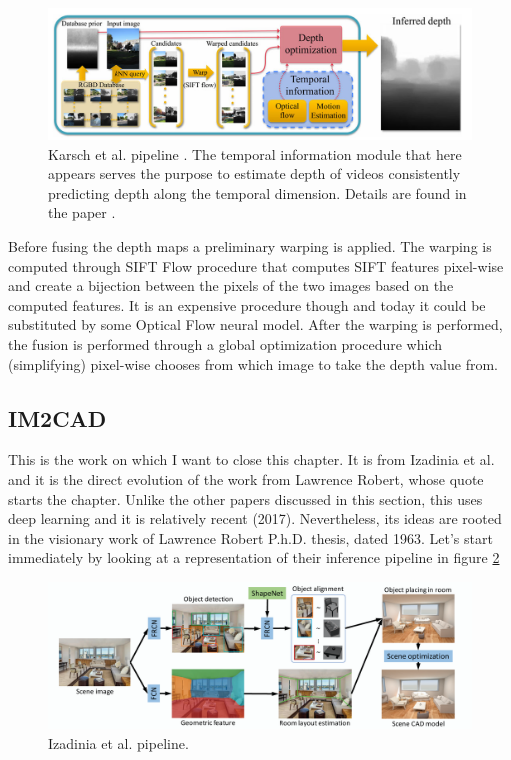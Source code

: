 \begin{figure}
	\centering
	\includegraphics[scale=0.3]{figs/depthtransfer}
	\caption{Karsch et al. pipeline \cite{DepthTransfer}. The temporal information module that here appears serves the purpose to estimate depth of videos consistently predicting depth along the temporal dimension. Details are found in the paper \cite{DepthTransfer}. \label{fig:depthtransfer}}
\end{figure}

Before fusing the depth maps a preliminary warping is applied.
The warping is computed through SIFT Flow procedure \cite{SIFTFlow} that computes SIFT features pixel-wise and create a bijection between the pixels of the two images based on the computed features.
It is an expensive procedure though and today it could be substituted by some Optical Flow neural model.
After the warping is performed, the fusion is performed through a global optimization procedure which (simplifying) pixel-wise chooses from which image to take the depth value from.

\subsection{IM2CAD}
This is the work on which I want to close this chapter.
It is from Izadinia et al. \cite{IM2CAD} and it is the direct evolution of the work from Lawrence Robert, whose quote starts the chapter.
Unlike the other papers discussed in this section, this uses deep learning and it is relatively recent (2017).
Nevertheless, its ideas are rooted in the visionary work of Lawrence Robert P.h.D. thesis, dated 1963.
Let's start immediately by looking at a representation of their inference pipeline in figure \ref{fig:im2cad}

\begin{figure}
	\centering
	\includegraphics[scale=0.3]{figs/im2cad}
	\caption{Izadinia et al. \cite{IM2CAD} pipeline. \label{fig:im2cad}}
\end{figure}

